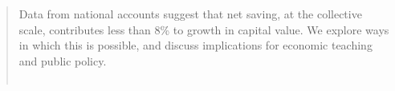 \documentclass[a4padisinvitingper,fleqn]{latex_styles/cas-sc}
\begin{document}








\begin{abstract}
Data from national accounts suggest that
net saving, at the collective scale, contributes less than 8\% to growth in capital value.
We explore ways in which this is
possible, and discuss implications for economic teaching and public
policy.     
\\ %
\\
\end{abstract}

\end{document}
